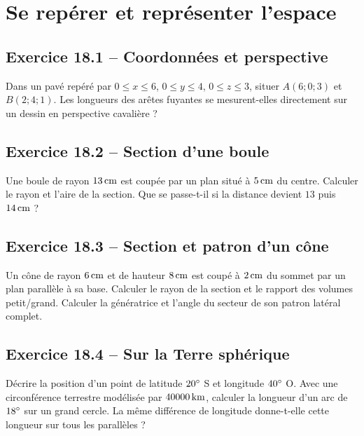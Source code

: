 \chapter{Se repérer et représenter l'espace}
\label{exercices:18}
\section*{Exercice 18.1 -- Coordonnées et perspective}
Dans un pavé repéré par $0\leq x\leq6$, $0\leq y\leq4$, $0\leq z\leq3$, situer $A(6;0;3)$ et $B(2;4;1)$. Les longueurs des arêtes fuyantes se mesurent-elles directement sur un dessin en perspective cavalière ?

\section*{Exercice 18.2 -- Section d'une boule}
Une boule de rayon $13\,\mathrm{cm}$ est coupée par un plan situé à $5\,\mathrm{cm}$ du centre. Calculer le rayon et l'aire de la section. Que se passe-t-il si la distance devient $13$ puis $14\,\mathrm{cm}$ ?

\section*{Exercice 18.3 -- Section et patron d'un cône}
Un cône de rayon $6\,\mathrm{cm}$ et de hauteur $8\,\mathrm{cm}$ est coupé à $2\,\mathrm{cm}$ du sommet par un plan parallèle à sa base. Calculer le rayon de la section et le rapport des volumes petit/grand. Calculer la génératrice et l'angle du secteur de son patron latéral complet.

\section*{Exercice 18.4 -- Sur la Terre sphérique}
Décrire la position d'un point de latitude $20^{\circ}$ S et longitude $40^{\circ}$ O. Avec une circonférence terrestre modélisée par $40000\,\mathrm{km}$, calculer la longueur d'un arc de $18^{\circ}$ sur un grand cercle. La même différence de longitude donne-t-elle cette longueur sur tous les parallèles ?
